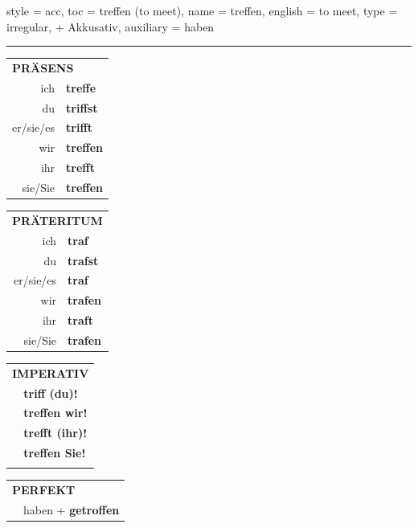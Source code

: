 \begin{verbentry}{
  style = {acc},
  toc = {treffen (to meet)},
  name = {treffen},
  english = {to meet},
  type = {irregular, + Akkusativ},
  auxiliary = {haben}
}
 
    
     \vspace{5pt}

    \hrule
    
    \vspace{5pt}

  \begin{tabular}{rl}
     \multicolumn{2}{l}{\textbf{PRÄSENS} }\\
    ich & \textbf{treffe}\\
    du & \textbf{triffst}\\
    er/sie/es & \textbf{trifft}\\
    wir & \textbf{treffen}\\
    ihr & \textbf{trefft}\\
    sie/Sie & \textbf{treffen}\\
  \end{tabular}
  \hfill
     \begin{tabular}{rl}
    \multicolumn{2}{l}{\textbf{PRÄTERITUM} }\\
    ich & \textbf{traf}\\
    du & \textbf{trafst}\\
    er/sie/es & \textbf{traf}\\
    wir & \textbf{trafen}\\
    ihr & \textbf{traft}\\
    sie/Sie & \textbf{trafen}\\
  \end{tabular}
  \hfill
  \begin{tabular}{rl}
     \multicolumn{2}{l}{\textbf{IMPERATIV} }\\
   & \textbf{triff (du)!}\\
   & \textbf{treffen wir!}\\
   & \textbf{trefft (ihr)!}\\
   & \textbf{treffen Sie!}\\
   & \vspace{10pt}
  \end{tabular}

    \vspace{10pt}

 \begin{tabular}{rl}
     \multicolumn{2}{l}{\textbf{PERFEKT}}\\
  &  haben + \textbf{getroffen}\\
  \end{tabular}
\hfill
   \begin{tabular}{rl}
   

\end{tabular}
\end{verbentry}
